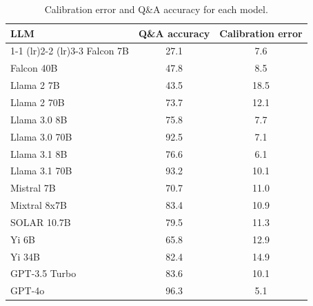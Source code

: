 \begin{table}[h]
\caption{Calibration error and Q\&A accuracy for each model.}
\label{tab:calibration_arc_prob_max}
\centering
\begin{tabular}{lcc}
\toprule
LLM & Q\&A accuracy & Calibration error \\ 
\cmidrule(lr){1-1} \cmidrule(lr){2-2} \cmidrule(lr){3-3}
Falcon 7B & 27.1 & 7.6\\
Falcon 40B & 47.8 & 8.5\\
Llama 2 7B & 43.5 & 18.5\\
Llama 2 70B & 73.7 & 12.1\\
Llama 3.0 8B & 75.8 & 7.7\\
Llama 3.0 70B & 92.5 & 7.1\\
Llama 3.1 8B & 76.6 & 6.1\\
Llama 3.1 70B & 93.2 & 10.1\\
Mistral 7B & 70.7 & 11.0\\
Mixtral 8x7B & 83.4 & 10.9\\
SOLAR 10.7B & 79.5 & 11.3\\
Yi 6B & 65.8 & 12.9\\
Yi 34B & 82.4 & 14.9\\
GPT-3.5 Turbo & 83.6 & 10.1\\
GPT-4o & 96.3 & 5.1\\
\bottomrule
\end{tabular}
\end{table}
